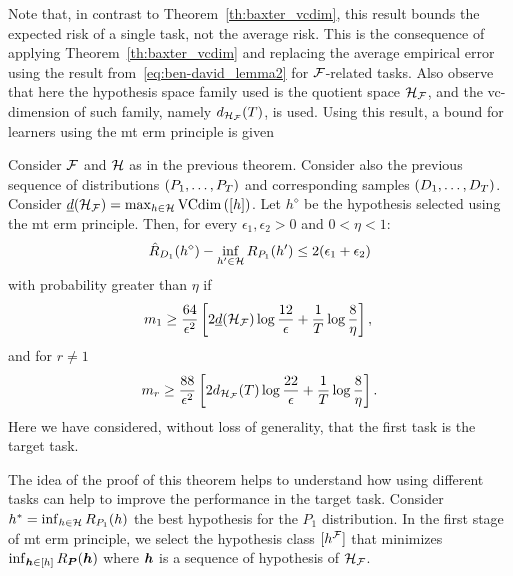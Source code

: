 Note that, in contrast to Theorem~\ref{th:baxter_vcdim}, this result bounds the expected risk of a single task, not the average risk. This is the consequence of applying Theorem~\ref{th:baxter_vcdim} and replacing the average empirical error using the result from~\eqref{eq:ben-david_lemma2} for $\mathcal{F}$-related tasks.
Also observe that here the hypothesis space family used is the quotient space $\mathcal{H}_{\mathcal{F}}$, and the \acrshort{vc}-dimension of such family, namely $d_{\mathcal{H}_{\mathcal{F}}}(T)$, is used.
%
Using this result, a bound for learners using the \acrshort{mt} \acrshort{erm} principle is given~\cite[Theorem~3]{Ben-DavidB08}
\begin{theorem}\label{th:ben-david_th3}
    Consider $\mathcal{F}$ and $\mathcal{H}$ as in the previous theorem. Consider also the previous sequence of distributions $(P_1, \ldots, P_T)$ and corresponding samples $(D_1, \ldots, D_T)$. Consider $\underline{d}(\mathcal{H}_{\mathcal{F}}) = \max_{h \in \mathcal{H}} \operatorname{VCdim}\left(\lbrack h\rbrack\right)$.
    Let $h^\diamond$ be the hypothesis selected using the \acrshort{mt} \acrshort{erm} principle. Then, for every $\epsilon_1, \epsilon_2 > 0$ and $0 < \eta < 1$:
    \begin{equation}
        \nonumber
        {\hat{R}_{D_1}(h^\diamond) - \inf_{h' \in \mathcal{H}}R_{P_1}(h')}  \leq 2(\epsilon_1 + \epsilon_2)
    \end{equation}
    with probability greater than $\eta$ if
    \begin{equation}
        \label{eq:ben-david_th3_ineq1}
        m_1 \geq  \frac{64}{\epsilon^2} \left[2 \underline{d}(\hypspace_\frelset) \log \frac{12}{\epsilon} + \frac{1}{\ntasks}\log\frac{8}{\eta} \right], \; 
    \end{equation}
    and for $r \neq 1$
    \begin{equation}
        \label{eq:ben-david_th3_ineq2}
        m_r \geq  \frac{88}{\epsilon^2} \left[2 d_{\hypspace_\frelset}(\ntasks) \log \frac{22}{\epsilon} + \frac{1}{\ntasks}\log\frac{8}{\eta} \right] .
    \end{equation}
    Here we have considered, without loss of generality, that the first task is the target task.
\end{theorem}
The idea of the proof of this theorem helps to understand how using different tasks can help to improve the performance in the target task. 
Consider $h^* = \inf_{h \in \mathcal{H}} R_{P_1}(h)$ the best hypothesis for the $P_1$ distribution.
%
In the first stage of \acrshort{mt} \acrshort{erm} principle, we select the hypothesis class $\lbrack h^{\mathcal{F}}\rbrack$ that minimizes $\inf_{\bm{h} \in \lbrack h\rbrack} R_{\bm{P}}(\bm{h})$ where $\bm{h}$ is a sequence of hypothesis of $\mathcal{H}_{\mathcal{F}}$.
